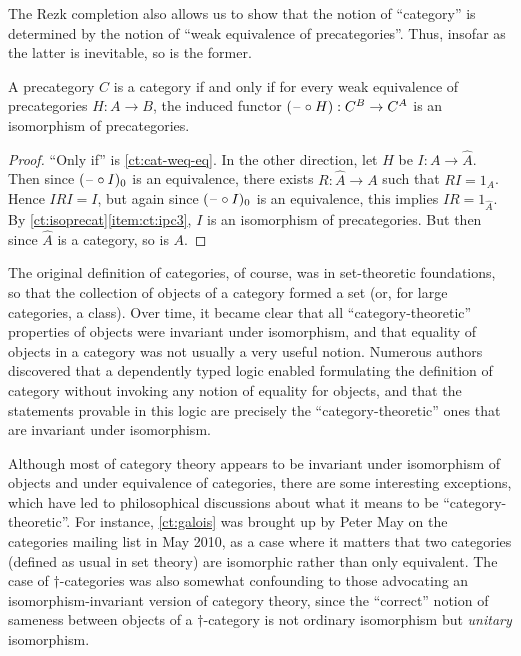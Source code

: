 The Rezk completion also allows us to show that the notion of ``category'' is determined by the notion of ``weak equivalence of precategories''.
Thus, insofar as the latter is inevitable, so is the former.

\begin{thm}\label{ct:weq-iso-precat-cat}
  A precategory $C$ is a category if and only if for every weak equivalence of precategories $H:A\to B$, the induced functor $(\mathord{\hspace{1pt}\text{--}\hspace{1pt}}\circ H):C^B \to C^A$ is an isomorphism of precategories.
\end{thm}
\begin{proof}
  ``Only if'' is \cref{ct:cat-weq-eq}.
  In the other direction, let $H$ be $I:A\to\widehat A$.
  Then since $(\mathord{\hspace{1pt}\text{--}\hspace{1pt}}\circ I)_0$ is an equivalence, there exists $R:\widehat A\to A$ such that $RI=1_A$.
  Hence $IRI=I$, but again since $(\mathord{\hspace{1pt}\text{--}\hspace{1pt}}\circ I)_0$ is an equivalence, this implies $IR =1_{\widehat A}$.
  By \cref{ct:isoprecat}\ref{item:ct:ipc3}, $I$ is an isomorphism of precategories.
  But then since $\widehat A$ is a category, so is $A$.
\end{proof}

%


\newpage

\sectionNotes

The original definition of categories, of course, was in set-theoretic foundations, so that the collection of objects of a category formed a set (or, for large categories, a class).
Over time, it became clear that all ``category-theoretic'' properties of objects were invariant under isomorphism, and that equality of objects in a category was not usually a very useful notion.
Numerous authors~\cite{blanc:eqv-log,freyd:invar-eqv,makkai:folds,makkai:comparing} discovered that a dependently typed logic enabled formulating the definition of category without invoking any notion of equality for objects, and that the statements provable in this logic are precisely the ``category-theoretic'' ones that are invariant under isomorphism.
%

Although most of category theory appears to be invariant under isomorphism of objects and under equivalence of categories, there are some interesting exceptions, which have led to philosophical discussions about what it means to be ``category-theoretic''.
For instance, \cref{ct:galois} was brought up by Peter May on the categories mailing list in May 2010, as a case where it matters that two categories (defined as usual in set theory) are isomorphic rather than only equivalent.
The case of $\dagger$-categories was also somewhat confounding to those advocating an isomorphism-invariant version of category theory, since the ``correct'' notion of sameness between objects of a $\dagger$-category is not ordinary isomorphism but \emph{unitary} isomorphism.
%

